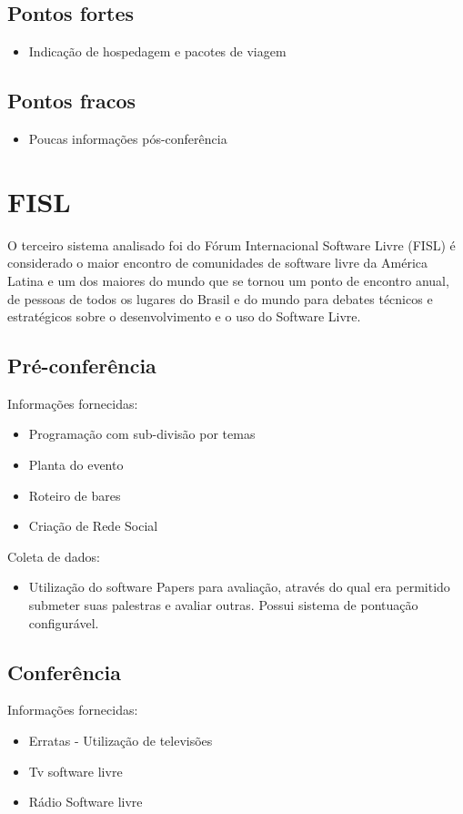 \documentclass[letter]{article}
\begin{document}
\subsection{Pontos fortes}
\begin{itemize}
\item Indicação de hospedagem e pacotes de viagem
\end{itemize}


\subsection{Pontos fracos}
\begin{itemize}
\item Poucas informações pós-conferência
\end{itemize}



\section{FISL}
O terceiro sistema analisado foi do Fórum Internacional Software Livre (FISL) é considerado o maior encontro de comunidades de software livre da América Latina e um dos maiores do mundo que se tornou um ponto de encontro anual, de pessoas de todos os lugares do Brasil e do mundo para debates técnicos e estratégicos sobre o desenvolvimento e o uso do Software Livre.


\subsection{Pré-conferência}
Informações fornecidas:
\begin{itemize}
\item Programação com sub-divisão por temas
\item Planta do evento
\item Roteiro de bares
\item Criação de Rede Social
\end{itemize}
Coleta de dados:
\begin{itemize}
\item Utilização do software Papers para avaliação, através do qual era permitido submeter suas palestras e avaliar outras. Possui sistema de pontuação configurável.  
\end{itemize}
\subsection{Conferência}
Informações fornecidas:
\begin{itemize}
\item Erratas - Utilização de televisões
\item Tv software livre
\item Rádio Software livre
\end{itemize}
\end{document}
